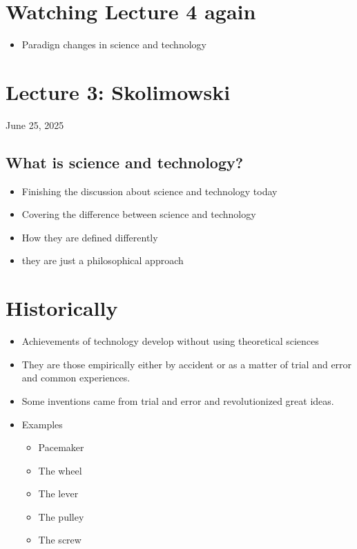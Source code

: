 \documentclass{article}
\begin{document}
\section*{Watching Lecture 4 again}
\begin{itemize}
  \item Paradign changes in science and technology
\end{itemize}

\section{Lecture 3: Skolimowski}
June 25, 2025

\subsection{What is science and technology?}
\begin{itemize}
  \item Finishing the discussion about
    science and technology today
  \item Covering the difference between
    science and technology
  \item How they are defined differently
  \item they are just a philosophical approach
\end{itemize}

\section*{Historically}
\begin{itemize}
  \item Achievements of technology develop without using
    theoretical sciences
  \item They are those empirically either by accident or as a matter of
    trial and error and common experiences.
  \item Some inventions came from trial and error and
    revolutionized great ideas.
  \item Examples
    \begin{itemize}
      \item Pacemaker
      \item The wheel
      \item The lever
      \item The pulley
      \item The screw
    \end{itemize}
\end{itemize}
\end{document}
